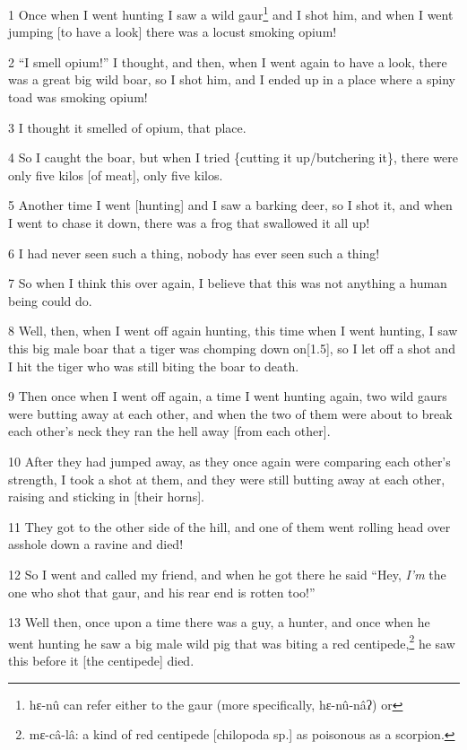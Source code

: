 
1 Once when I went hunting I saw a wild gaur\footnote{hɛ-nû can refer either to the gaur (more specifically, hɛ-nû-nâʔ) or} and I shot him, and when I went
jumping [to have a look] there was a locust smoking opium!

2 ``I smell opium!'' I thought, and then, when I went again to have a look, there
was a great big wild boar, so I shot him, and I ended up in a place where a spiny
toad was smoking opium!

3 I thought it smelled of opium, that place.

4 So I caught the boar, but when I tried \{cutting it up/butchering it\}, there
were only five kilos [of meat], only five kilos.

5 Another time I went [hunting] and I saw a barking deer, so I shot it, and when
I went to chase it down, there was a frog that swallowed it all up!

6 I had never seen such a thing, nobody has ever seen such a thing!

7 So when I think this over again, I believe that this was not anything a human
being could do.

8 Well, then, when I went off again hunting, this time when I went hunting, I saw
this big male boar that a tiger was chomping down on[1.5], so I let off a shot
and I hit the tiger who was still biting the boar to death.

9 Then once when I went off again, a time I went hunting again, two wild gaurs
were butting away at each other, and when the two of them were about to break each
other's neck they ran the hell away [from each other].

10 After they had jumped away, as they once again were comparing each other's strength,
I took a shot at them, and they were still butting away at each other, raising
and sticking in [their horns].

11 They got to the other side of the hill, and one of them went rolling head over
asshole down a ravine and died!

12 So I went and called my friend, and when he got there he said ``Hey, \textit{I'm}
the one who shot that gaur, and his rear end is rotten too!''

13 Well then, once upon a time there was a guy, a hunter, and once when he went
hunting he saw a big male wild pig that was biting a red centipede,\footnote{mɛ-câ-lâ: a kind of red centipede [chilopoda sp.] as poisonous as a scorpion.} he saw this
before it [the centipede] died.

